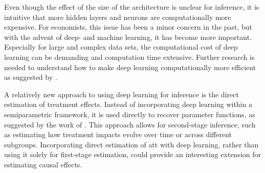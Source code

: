 Even though the effect of the size of the architecture is unclear for inference, it is intuitive that more hidden layers and neurons are computationally more expensive.
For economists, this issue has been a minor concern in the past, but with the advent of deep- and machine learning, it has become more important.
Especially for large and complex data sets, the computational cost of deep learning can be demanding and computation time extensive.
Further research is needed to understand how to make deep learning computationally more efficient as suggested by \citet{farrellDeepNeuralNetworks2021}.

A relatively new approach to using deep learning for inference is the direct estimation of treatment effects.
Instead of incorporating deep learning within a semiparametric framework, it is used directly to recover parameter functions, as suggested by the work of \citet{DeepLearningIndividual2021}.
This approach allows for second-stage inference, such as estimating how treatment impacts evolve over time or across different subgroups.
Incorporating direct estimation of \ac{att} with deep learning, rather than using it solely for first-stage estimation, could provide an interesting extension for estimating causal effects.
